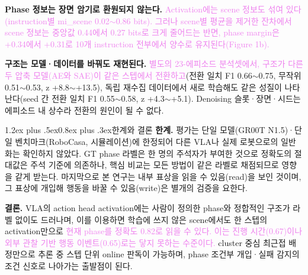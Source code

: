 \documentclass[a4paper,twocolumn,9pt]{extarticle}
\makeatletter
\newcommand{\rev}[1]{\textcolor{violet}{#1}}  %
\newcommand{\chg}[1]{\textcolor{green!55!black}{#1}}  %
\renewcommand\section{\@startsection{section}{1}{\z@}%
  {1.2ex plus .5ex}{0.8ex plus .3ex}{\normalsize\bfseries}}
\makeatother
\begin{document}
\textbf{Phase 정보는 장면 암기로 환원되지 않는다.} \rev{Activation에는 scene 정보도 섞여 있다(instruction별 mi\_scene 0.02$\sim$0.86 bits). 그러나 scene별 평균을 제거한 잔차에서 scene 정보는 중앙값 0.44에서 0.27 bits로 크게 줄어드는 반면, phase margin은 +0.34에서 +0.31로 10개 instruction 전부에서 양수로 유지된다(Figure 1b).}

\textbf{구조는 모델·데이터를 바꿔도 재현된다.} \rev{별도의 23-에피소드 분석셋에서, 구조가 다른 두 압축 모델(AE와 SAE)이 같은 스텝에서 전환하고}(\chg{전환 일치 F1} 0.66$\sim$0.75, 무작위 0.51$\sim$0.53, z +8.8$\sim$+13.5), 독립 재수집 데이터에서 새로 학습해도 같은 성질이 나타난다(seed 간 \chg{전환 일치 F1} 0.55$\sim$0.58, z +4.3$\sim$+5.1). Denoising 슬롯·장면·시드는 에피소드 내 상수라 전환의 원인이 될 수 없다.



\section{한계와 결론}
\textbf{한계.} 평가는 단일 모델(GR00T N1.5)·단일 벤치마크(RoboCasa, 시뮬레이션)에 한정되어 다른 VLA나 실제 로봇으로의 일반화는 확인하지 않았다. GT phase 라벨은 한 명의 주석자가 부여한 것으로 정확도의 절대값은 주석 기준에 의존하나, 핵심 비교는 모든 방법이 같은 라벨로 채점되므로 영향을 같게 받는다. 마지막으로 본 연구는 내부 표상을 읽을 수 있음(read)을 보인 것이며, 그 표상에 개입해 행동을 바꿀 수 있음(write)은 별개의 검증을 요한다.

\textbf{결론.} VLA의 action head activation에는 사람이 정의한 phase와 정합적인 구조가 라벨 없이도 드러나며, 이를 이용하면 학습에 쓰지 않은 scene에서도 한 스텝의 activation만으로 \rev{현재 phase를 정확도 0.82로 읽을 수 있다. 이는 진행 시간(0.67)이나 외부 관찰 기반 행동 이벤트(0.65)로는 닿지 못하는 수준이다.} cluster 중심 최근접 배정만으로 추론 중 스텝 단위 online 판독이 가능하며, phase 조건부 개입·실패 감지의 조건 신호로 나아가는 출발점이 된다.

\end{document}
